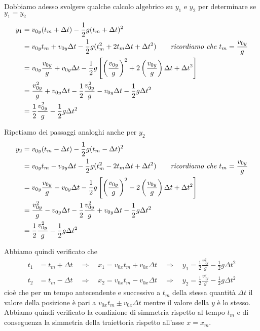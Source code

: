 \documentclass{article}
\begin{document}
Dobbiamo adesso svolgere qualche calcolo algebrico su $y_1$ e $y_2$ per determinare se $y_1 = y_2$
\begin{align}
  y_1 &= v_{0y} (t_m + \Delta t) - \frac{1}{2}g(t_m + \Delta t)^2 \\
      &= v_{0y} t_m + v_{0y} \Delta t - \frac{1}{2}g (t_m^2 + 2 t_m \Delta t + \Delta t^2) \qquad \text{\textit{ricordiamo che $t_m = \frac{v_{0y}}{g}$}} \\
      &= v_{0y} \frac{v_{0y}}{g} + v_{0y} \Delta t - \frac{1}{2}g \left[\left(\frac{v_{0y}}{g}\right)^2 + 2 \left(\frac{v_{0y}}{g}\right) \Delta t + \Delta t^2\right] \\
      &= \frac{v_{0y}^2}{g} + v_{0y} \Delta t - \frac{1}{2} \frac{v_{0y}^2}{g} - v_{0y} \Delta t - \frac{1}{2}g \Delta t ^2 \\
      &= \frac{1}{2} \frac{v_{0y}^2}{g} - \frac{1}{2}g \Delta t ^2
\end{align}

Ripetiamo dei passaggi analoghi anche per $y_2$
\begin{align}
  y_2 &= v_{0y} (t_m - \Delta t) - \frac{1}{2}g(t_m - \Delta t)^2 \\
      &= v_{0y} t_m - v_{0y} \Delta t - \frac{1}{2}g (t_m^2 - 2 t_m \Delta t + \Delta t^2) \qquad \text{\textit{ricordiamo che $t_m = \frac{v_{0y}}{g}$}} \\
      &= v_{0y} \frac{v_{0y}}{g} - v_{0y} \Delta t - \frac{1}{2}g \left[\left(\frac{v_{0y}}{g}\right)^2 - 2 \left(\frac{v_{0y}}{g}\right) \Delta t + \Delta t^2\right] \\
      &= \frac{v_{0y}^2}{g} - v_{0y} \Delta t - \frac{1}{2} \frac{v_{0y}^2}{g} + v_{0y} \Delta t - \frac{1}{2}g \Delta t ^2 \\
      &= \frac{1}{2} \frac{v_{0y}^2}{g} - \frac{1}{2}g \Delta t ^2
\end{align}

Abbiamo quindi verificato che
\begin{align}
  t_1 &= t_m + \Delta t 
  \quad \Rightarrow \quad x_1 = v_{0x} t_m + v_{0x} \Delta t
  \quad \Rightarrow \quad y_1 = \frac{1}{2} \frac{v_{0y}^2}{g} - \frac{1}{2}g \Delta t ^2 \\
  t_2 &= t_m - \Delta t 
  \quad \Rightarrow \quad x_2 = v_{0x} t_m - v_{0x} \Delta t
  \quad \Rightarrow \quad y_2 = \frac{1}{2} \frac{v_{0y}^2}{g} - \frac{1}{2}g \Delta t ^2
\end{align}
cioè che per un tempo antecendente e successivo a $t_m$ della stessa quantità $\Delta t$ il valore della posizione è pari a $v_{0x}t_m \pm v_{0x} \Delta t$ mentre il valore della $y$ è lo stesso. Abbiamo quindi verificato la condizione di simmetria rispetto al tempo $t_m$ e di conseguenza la simmetria della traiettoria rispetto all'asse $x=x_m$. 
\end{document}
